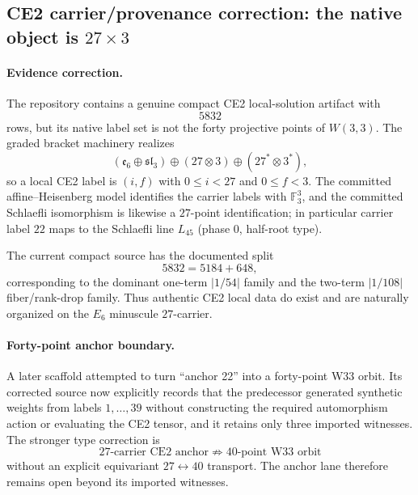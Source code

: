 \subsection{CE2 carrier/provenance correction: the native object is $27\times3$}
\label{sec:ce2-carrier-provenance-correction}

\paragraph{Evidence correction.}
The repository contains a genuine compact CE2 local-solution artifact with
\[
\boxed{5832}
\]
rows, but its native label set is not the forty projective points of $W(3,3)$.
The graded bracket machinery realizes
\[
(\mathfrak e_6\oplus\mathfrak{sl}_3)
\oplus(27\otimes3)
\oplus(27^*\otimes3^*),
\]
so a local CE2 label is $(i,f)$ with $0\le i<27$ and $0\le f<3$.
The committed affine--Heisenberg model identifies the carrier labels with
$\mathbb F_3^3$, and the committed Schlaefli isomorphism is likewise a
$27$-point identification; in particular carrier label $22$ maps to the
Schlaefli line $L_{45}$ (phase $0$, half-root type).

The current compact source has the documented split
\[
\boxed{5832=5184+648},
\]
corresponding to the dominant one-term $|1/54|$ family and the two-term
$|1/108|$ fiber/rank-drop family. Thus authentic CE2 local data do exist and
are naturally organized on the $E_6$ minuscule $27$-carrier.

\paragraph{Forty-point anchor boundary.}
A later scaffold attempted to turn ``anchor 22'' into a forty-point W33 orbit.
Its corrected source now explicitly records that the predecessor generated
synthetic weights from labels $1,\ldots,39$ without constructing the required
automorphism action or evaluating the CE2 tensor, and it retains only three
imported witnesses. The stronger type correction is
\[
\boxed{
27\text{-carrier CE2 anchor}
\not\Rightarrow
40\text{-point W33 orbit}
}
\]
without an explicit equivariant $27\leftrightarrow40$ transport. The anchor
lane therefore remains open beyond its imported witnesses.

